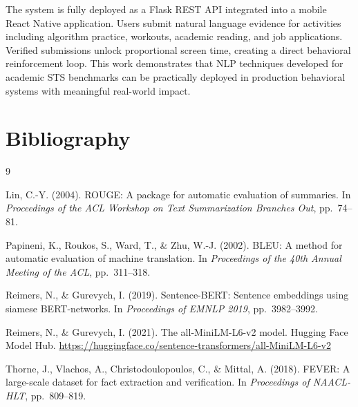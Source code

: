 \documentclass[11pt]{article}
\begin{document}
The system is fully deployed as a Flask REST API integrated into a mobile React Native
application. Users submit natural language evidence for activities including algorithm
practice, workouts, academic reading, and job applications. Verified submissions unlock
proportional screen time, creating a direct behavioral reinforcement loop. This work
demonstrates that NLP techniques developed for academic STS benchmarks can be
practically deployed in production behavioral systems with meaningful real-world impact.

\section{Bibliography}

\begin{thebibliography}{9}

Lin, C.-Y. (2004).
ROUGE: A package for automatic evaluation of summaries.
In \textit{Proceedings of the ACL Workshop on Text Summarization Branches Out},
pp.\ 74--81.

Papineni, K., Roukos, S., Ward, T., \& Zhu, W.-J. (2002).
BLEU: A method for automatic evaluation of machine translation.
In \textit{Proceedings of the 40th Annual Meeting of the ACL}, pp.\ 311--318.

Reimers, N., \& Gurevych, I. (2019).
Sentence-BERT: Sentence embeddings using siamese BERT-networks.
In \textit{Proceedings of EMNLP 2019}, pp.\ 3982--3992.

Reimers, N., \& Gurevych, I. (2021).
The all-MiniLM-L6-v2 model.
Hugging Face Model Hub.
\url{https://huggingface.co/sentence-transformers/all-MiniLM-L6-v2}

Thorne, J., Vlachos, A., Christodoulopoulos, C., \& Mittal, A. (2018).
FEVER: A large-scale dataset for fact extraction and verification.
In \textit{Proceedings of NAACL-HLT}, pp.\ 809--819.

\end{thebibliography}
\end{document}

